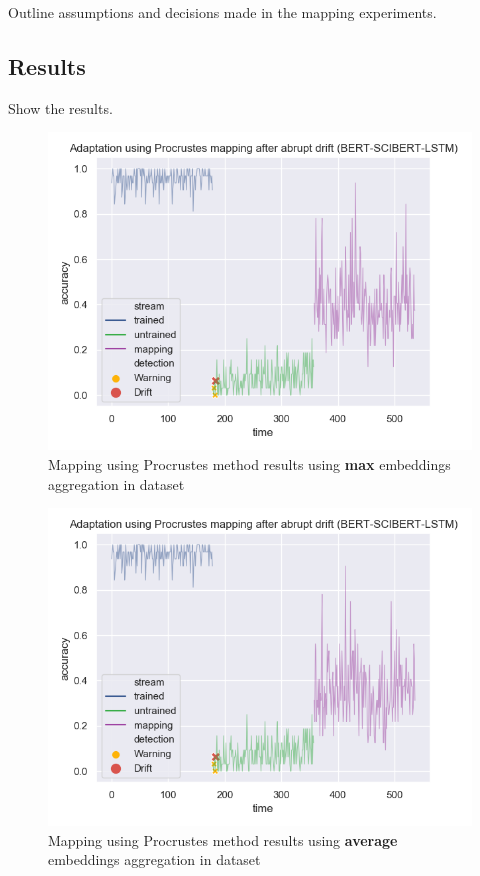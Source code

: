 \documentclass[12pt]{extreport}
\begin{document}
Outline assumptions and decisions made in the mapping experiments.

\subsection{Results}

Show the results.

\begin{figure}[ht!]
\centering
\includegraphics[width=0.8\linewidth]{assets/addressing-change/procrustes_lstm_wos_1_BERT_SCIBERT_5000_words_max.png}
\caption{Mapping using Procrustes method results using \textbf{max} embeddings aggregation in dataset}
\label{fig:proc-max}
\end{figure}

\begin{figure}[ht!]
\centering
\includegraphics[width=0.8\linewidth]{assets/addressing-change/procrustes_lstm_wos_1_BERT_SCIBERT_5000_words_average.png}
\caption{Mapping using Procrustes method results using \textbf{average} embeddings aggregation in dataset}
\label{fig:proc-average}
\end{figure}
\end{document}
